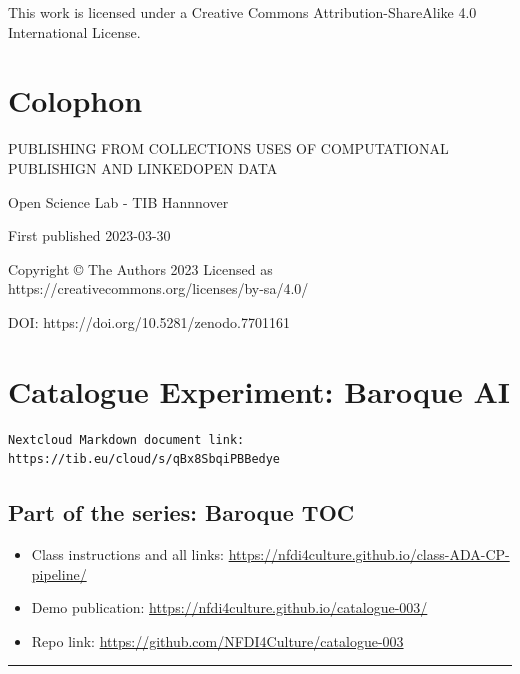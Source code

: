 \documentclass[
  letterpaper,
]{book}
\providecommand{\tightlist}{%
  \setlength{\itemsep}{0pt}\setlength{\parskip}{0pt}}\usepackage{longtable,booktabs,array}
\begin{document}
This work is licensed under a Creative Commons Attribution-ShareAlike
4.0 International License.


\hypertarget{colophon}{%
\chapter{Colophon}\label{colophon}}

PUBLISHING FROM COLLECTIONS USES OF COMPUTATIONAL PUBLISHIGN AND
LINKEDOPEN DATA

Open Science Lab - TIB Hannnover

First published 2023-03-30

Copyright © The Authors 2023 Licensed as
https://creativecommons.org/licenses/by-sa/4.0/

DOI: https://doi.org/10.5281/zenodo.7701161


\hypertarget{catalogue-experiment-baroque-ai}{%
\chapter{Catalogue Experiment: Baroque
AI}\label{catalogue-experiment-baroque-ai}}

\begin{verbatim}
Nextcloud Markdown document link: https://tib.eu/cloud/s/qBx8SbqiPBBedye 
\end{verbatim}

\hypertarget{part-of-the-series-baroque-toc-1}{%
\section{Part of the series: Baroque
TOC}\label{part-of-the-series-baroque-toc-1}}

\begin{itemize}
\tightlist
\item
  Class instructions and all links:
  \url{https://nfdi4culture.github.io/class-ADA-CP-pipeline/}
\item
  Demo publication: \url{https://nfdi4culture.github.io/catalogue-003/}
\item
  Repo link: \url{https://github.com/NFDI4Culture/catalogue-003}
\end{itemize}

\begin{center}\rule{0.5\linewidth}{0.5pt}\end{center}
\end{document}
